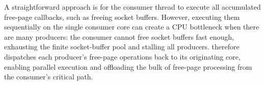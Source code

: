 A straightforward approach is for the consumer thread to execute all accumulated free-page callbacks,
    such as freeing socket buffers.
However, executing them sequentially on the single consumer core can create a CPU bottleneck
    when there are many producers:
the consumer cannot free socket buffers fast enough, exhausting the finite socket-buffer pool and stalling all producers.
\vfreebrand therefore dispatches each producer's free-page operations back to its originating core,
enabling parallel execution and offloading the bulk of free-page processing from the consumer's critical path.


